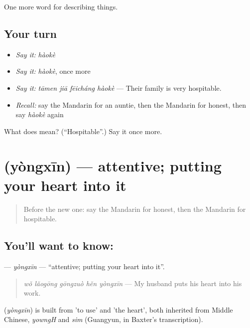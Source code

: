 \begin{grammarlens}[title={What you've built}]
One more word for describing things.
\end{grammarlens}

\subsection*{Your turn}
\begin{itemize}
\raggedright
  \item \emph{Say it:} \emph{hàokè}
  \item \emph{Say it:} \emph{hàokè}, once more
  \item \emph{Say it:} \emph{tāmen jiā fēicháng hàokè} — Their family is very hospitable.
  \item \emph{Recall:} say the Mandarin for an auntie, then the Mandarin for honest, then say \emph{hàokè} again
\end{itemize}

\begin{tcolorbox}[breakable,colback=teal!4,colframe=teal!35!black,title={Before you move on}]
What does  mean? (\textquotedblleft{}Hospitable\textquotedblright{}.) Say it once more.
\end{tcolorbox}
\section[\texorpdfstring{\zh{用心} (yòngxīn)}{用心 (yòngxīn)}]{ (yòngxīn) — attentive; putting your heart into it}

\label{lesson:ZH-C273-yongxin}



\begin{quote}
Before the new one: say the Mandarin for honest, then the Mandarin for hospitable.
\end{quote}

\subsection*{You'll want to know: }
\textbf{} — \emph{yòngxīn} — \textquotedblleft{}attentive; putting your heart into it\textquotedblright{}.

\begin{quote}
\textbf{} \emph{wǒ lǎogōng gōngzuò hěn yòngxīn} — My husband puts his heart into his work.
\end{quote}

\begin{cousinweb}
\textbf{} (\emph{yòngxīn}) is built from  'to use' and  'the heart', both inherited from Middle Chinese, \emph{yowngH} and \emph{sim} (Guangyun, in Baxter's transcription).
\end{cousinweb}

